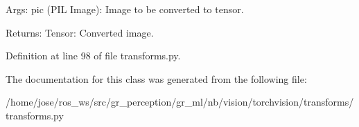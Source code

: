 \begin{DoxyVerb}Args:
    pic (PIL Image): Image to be converted to tensor.

Returns:
    Tensor: Converted image.
\end{DoxyVerb}
 

Definition at line 98 of file transforms.\+py.



The documentation for this class was generated from the following file\+:\begin{DoxyCompactItemize}
\item 
/home/jose/ros\+\_\+ws/src/gr\+\_\+perception/gr\+\_\+ml/nb/vision/torchvision/transforms/transforms.\+py\end{DoxyCompactItemize}
